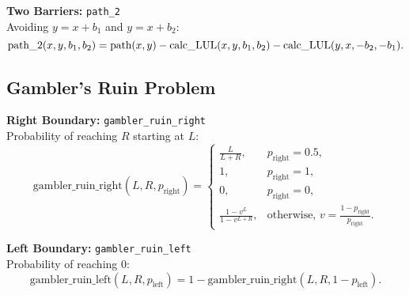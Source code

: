     \textbf{Two Barriers:} \texttt{path\_2} \\
    Avoiding $y=x+b_1$ and $y=x+b_2$:
    \[
    \text{path\_2}(x, y, b_1, b_2) = \text{path}(x, y) -\\
    \text{calc\_LUL}(x, y, b_1, b_2) - \text{calc\_LUL}(y, x, -b_2, -b_1).
    \]

    \subsection{Gambler's Ruin Problem}
    \textbf{Right Boundary:} \texttt{gambler\_ruin\_right} \\
    Probability of reaching $R$ starting at $L$:
    \[
    \text{gambler\_ruin\_right}(L, R, p_{\text{right}}) =
    \begin{cases}
    \frac{L}{L+R}, & p_{\text{right}} = 0.5, \\
    1, & p_{\text{right}} = 1, \\
    0, & p_{\text{right}} = 0, \\
    \frac{1 - v^L}{1 - v^{L+R}}, & \text{otherwise, } v = \frac{1-p_{\text{right}}}{p_{\text{right}}}.
    \end{cases}
    \]

    \textbf{Left Boundary:} \texttt{gambler\_ruin\_left} \\
    Probability of reaching $0$:
    \[
    \text{gambler\_ruin\_left}(L, R, p_{\text{left}}) = 1 - \text{gambler\_ruin\_right}(L, R, 1-p_{\text{left}}).
    \]